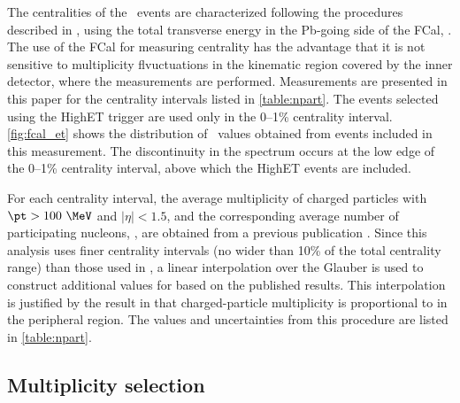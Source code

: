 The centralities of the \pPb\ events are characterized following the procedures described in , using the total transverse energy in the Pb-going side of the \ac{FCal}, \sumETPb.
The use of the \ac{FCal} for measuring centrality has the advantage that it is not sensitive to multiplicity flvuctuations in the kinematic region covered by the inner detector, where the measurements are performed.
Measurements are presented in this paper for the centrality intervals listed in \cref{table:npart}.
The events selected using the \ac{HighET} trigger are used only in the 0--1\% centrality interval.
\cref{fig:fcal_et} shows the distribution of \sumETPb\ values obtained from events included in this
measurement.
The discontinuity in the spectrum occurs at the low edge of the 0--1\% centrality interval, above which the \ac{HighET} events are included.

For each centrality interval, the average multiplicity of charged particles with $\pt > 100~\MeV$ and $|\eta| < 1.5$, \avgdNdeta and the corresponding average number of participating nucleons, \avgNpart, are obtained from a previous publication \cite{HION-2012-15}.
Since this analysis uses finer centrality intervals (no wider than 10\% of the total centrality range) than
those used in , a linear interpolation over the Glauber \avgNpart is used to construct additional values for \avgdNdeta based on the published results.
This interpolation is justified by the result in  that charged-particle multiplicity is proportional to \avgNpart in the peripheral region.
The values and uncertainties from this procedure are listed in \cref{table:npart}.

 

\subsection{Multiplicity selection}

